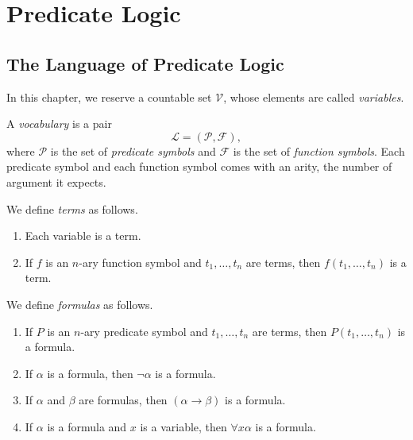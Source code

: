 \chapter{Predicate Logic}
\section{The Language of Predicate Logic}
In this chapter, we reserve a countable set $\mathcal{V}$, whose elements are
called \emph{variables}.

\begin{definition}
  A \emph{vocabulary} is a pair
  \begin{equation*}
    \mathcal{L} = (\mathcal{P}, \mathcal{F}),
  \end{equation*}
  where $\mathcal{P}$ is the set of \emph{predicate symbols} and $\mathcal{F}$
  is the set of \emph{function symbols}.
  Each predicate symbol and each function symbol comes with an arity, the
  number of argument it expects.
\end{definition}

\begin{definition}
  We define \emph{terms} as follows.
  \begin{enumerate}[1.]
    \item Each variable is a term.
    \item If $f$ is an $n$-ary function symbol and $t_1, \dots, t_n$ are terms,
    then $f(t_1, \dots, t_n)$ is a term.
  \end{enumerate}
\end{definition}

\begin{definition}
  We define \emph{formulas} as follows.
  \begin{enumerate}[1.]
    \item If $P$ is an $n$-ary predicate symbol and $t_1, \dots, t_n$ are
    terms, then $P(t_1, \dots, t_n)$ is a formula.
    \item If $\alpha$ is a formula, then $\neg\alpha$ is a formula.
    \item If $\alpha$ and $\beta$ are formulas, then $(\alpha \to \beta)$ is a
    formula.
    \item If $\alpha$ is a formula and $x$ is a variable, then
    $\forall x \alpha$ is a formula.
  \end{enumerate}
\end{definition}

